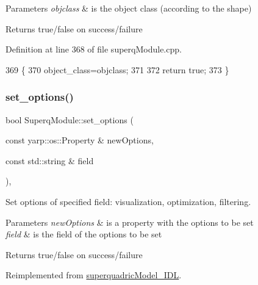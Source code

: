 \begin{DoxyParams}{Parameters}
{\em objclass} & is the object class (according to the shape) \\
\hline
\end{DoxyParams}
\begin{DoxyReturn}{Returns}
true/false on success/failure 
\end{DoxyReturn}


Definition at line 368 of file superq\+Module.\+cpp.


\begin{DoxyCode}
369 \{
370     object\_class=objclass;
371 
372     \textcolor{keywordflow}{return} \textcolor{keyword}{true};
373 \}
\end{DoxyCode}
\mbox{\label{classSuperqModule_a32ccf59ac0572ca77883237dd2d12890}} 
\subsubsection{\texorpdfstring{set\+\_\+options()}{set\_options()}}
{\footnotesize\ttfamily bool Superq\+Module\+::set\+\_\+options (\begin{DoxyParamCaption}\item[{const yarp\+::os\+::\+Property \&}]{new\+Options,  }\item[{const std\+::string \&}]{field }\end{DoxyParamCaption})\hspace{0.3cm}{\ttfamily [protected]}, {\ttfamily [virtual]}}



Set options of specified field\+: visualization, optimization, filtering. 


\begin{DoxyParams}{Parameters}
{\em new\+Options} & is a property with the options to be set \\
\hline
{\em field} & is the field of the options to be set \\
\hline
\end{DoxyParams}
\begin{DoxyReturn}{Returns}
true/false on success/failure 
\end{DoxyReturn}


Reimplemented from \mbox{\hyperlink{classsuperquadricModel__IDL_a575e0b591f07206b0d6c29e5cfeead37}{superquadric\+Model\+\_\+\+I\+DL}}.



